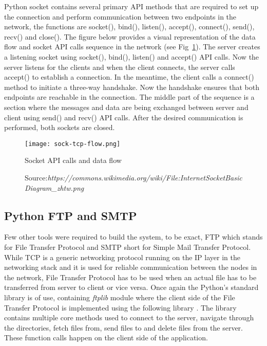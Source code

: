 \documentclass[10pt]{report}
\begin{document}
Python socket contains several primary API methods that are required to set up the connection and perform communication between two endpoints in the network, the functions are socket(), bind(), listen(), accept(), connect(), send(), recv() and close(). The figure below provides a visual representation of the data flow and socket API calls sequence in the network (see Fig~\ref{fig:socketflow}). The server creates a listening socket using socket(), bind(), listen() and accept() API calls. Now the server listens for the clients and when the client connects, the server calls accept() to establish a connection.
In the meantime, the client calls a connect() method to initiate a three-way handshake. Now the handshake ensures that both endpoints are reachable in the connection. The middle part of the sequence is a section where the messages and data are being exchanged between server and client using send() and recv() API calls. After the desired communication is performed, both sockets are closed.

\begin{figure}[htp]
    \centering
    \texttt{[image: sock-tcp-flow.png]}
    \caption{Socket API calls and data flow}
    \label{fig:socketflow}
    \caption*{Source:\textit{https://commons.wikimedia.org/wiki/File:InternetSocketBasicDiagram\_zhtw.png}}
\end{figure}

\subsection{Python FTP and SMTP}

Few other tools were required to build the system, to be exact, FTP which stands for File Transfer Protocol and SMTP short for Simple Mail Transfer Protocol. While TCP is a generic networking protocol running on the IP layer in the networking stack and it is used for reliable communication between the nodes in the network, File Transfer Protocol has to be used when an actual file has to be transferred from server to client or vice versa. Once again the Python's standard library is of use, containing \textit{ftplib} module where the client side of the File Transfer Protocol is implemented using the following library \cite{ftp}. The library contains multiple core methods used to connect to the server, navigate through the directories, fetch files from, send files to and delete files from the server. These function calls happen on the client side of the application.
\newline
\end{document}
